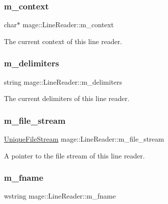 \subsubsection{\texorpdfstring{m\+\_\+context}{m\_context}}
{\footnotesize\ttfamily char$\ast$ mage\+::\+Line\+Reader\+::m\+\_\+context\hspace{0.3cm}{\ttfamily [protected]}}

The current context of this line reader. \hypertarget{classmage_1_1_line_reader_a6de3398ac59fdd98f8c40cff6f5c1075}{}\label{classmage_1_1_line_reader_a6de3398ac59fdd98f8c40cff6f5c1075} 
\subsubsection{\texorpdfstring{m\+\_\+delimiters}{m\_delimiters}}
{\footnotesize\ttfamily string mage\+::\+Line\+Reader\+::m\+\_\+delimiters\hspace{0.3cm}{\ttfamily [private]}}

The current delimiters of this line reader. \hypertarget{classmage_1_1_line_reader_a510ff5355c6d26d7c29dc692ef18a3e2}{}\label{classmage_1_1_line_reader_a510ff5355c6d26d7c29dc692ef18a3e2} 
\subsubsection{\texorpdfstring{m\+\_\+file\+\_\+stream}{m\_file\_stream}}
{\footnotesize\ttfamily \hyperlink{namespacemage_a0ee1bd45ad7dbb3dc8c8e1770e3538d4}{Unique\+File\+Stream} mage\+::\+Line\+Reader\+::m\+\_\+file\+\_\+stream\hspace{0.3cm}{\ttfamily [private]}}

A pointer to the file stream of this line reader. \hypertarget{classmage_1_1_line_reader_ad6f55ba12fc610ab2fc1c26a48d12321}{}\label{classmage_1_1_line_reader_ad6f55ba12fc610ab2fc1c26a48d12321} 
\subsubsection{\texorpdfstring{m\+\_\+fname}{m\_fname}}
{\footnotesize\ttfamily wstring mage\+::\+Line\+Reader\+::m\+\_\+fname\hspace{0.3cm}{\ttfamily [private]}}

